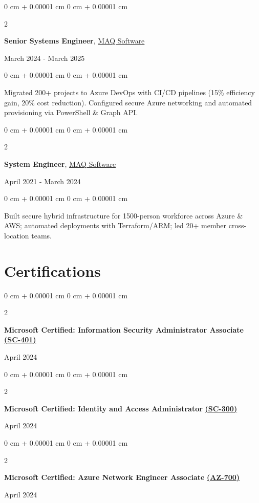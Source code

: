 \documentclass[10pt, letterpaper]{article}
\newenvironment{onecolentry}{
    \begin{adjustwidth}{
        0 cm + 0.00001 cm
    }{
        0 cm + 0.00001 cm
    }
}{
    \end{adjustwidth}
}
\newenvironment{twocolentry}[2][]{
    \onecolentry
    \def\secondColumn{#2}
    \setcolumnwidth{\fill, 4.5 cm}
    \begin{paracol}{2}
}{
    \switchcolumn \raggedleft \secondColumn
    \end{paracol}
    \endonecolentry
}
\begin{document}
\begin{twocolentry}{March 2024 - March 2025}
    \textbf{Senior Systems Engineer}, \href{https://maqsoftware.com/}{MAQ Software}
\end{twocolentry}

\vspace{0.10 cm}
\begin{onecolentry}
    Migrated 200+ projects to Azure DevOps with CI/CD pipelines (15\% efficiency gain, 20\% cost reduction). Configured secure Azure networking and automated provisioning via PowerShell \& Graph API.
\end{onecolentry}

\vspace{0.2 cm}

\begin{twocolentry}{April 2021 - March 2024}
    \textbf{System Engineer}, \href{https://maqsoftware.com/}{MAQ Software}
\end{twocolentry}

\vspace{0.10 cm}
\begin{onecolentry}
    Built secure hybrid infrastructure for 1500-person workforce across Azure \& AWS; automated deployments with Terraform/ARM; led 20+ member cross-location teams.
\end{onecolentry}

\section{Certifications}

\vspace{0.2 cm}

\begin{twocolentry}{April 2024}
    \textbf{Microsoft Certified: Information Security Administrator Associate} \href{https://learn.microsoft.com/api/credentials/share/en-in/ChinmayDhokMAQSoftware-5822/175A9EF2AB5B5B56?sharingId=BC2982D57159EF1A}{\textbf{(SC-401)}}
\end{twocolentry}

\vspace{0.05 cm}
\begin{twocolentry}{April 2024}
    \textbf{Microsoft Certified: Identity and Access Administrator} \href{https://learn.microsoft.com/en-us/users/chinmaydhokmaqsoftware-5822/credentials/82be0c3d23d052b8}{\textbf{(SC-300)}}
\end{twocolentry}

\vspace{0.05 cm}
\begin{twocolentry}{April 2024}
    \textbf{Microsoft Certified: Azure Network Engineer Associate} \href{https://learn.microsoft.com/en-us/users/ChinmayDhokMAQSoftware-5822/credentials/4244163FEBBEDDAF}{\textbf{(AZ-700)}}
\end{twocolentry}
\end{document}

